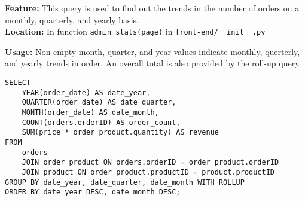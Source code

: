 \textbf{Feature:} This query is used to find out the trends in the number of orders on a monthly, quarterly, and yearly basis. \\
\textbf{Location:} In function \texttt{admin\_stats(page)} in \texttt{front-end/\_\_init\_\_.py}

\textbf{Usage:}
Non-empty month, quarter, and year values indicate monthly, querterly, and yearly trends in order.
An overall total is also provided by the roll-up query.

\begin{lstlisting}
SELECT
    YEAR(order_date) AS date_year,
    QUARTER(order_date) AS date_quarter,
    MONTH(order_date) AS date_month,
    COUNT(orders.orderID) AS order_count,
    SUM(price * order_product.quantity) AS revenue
FROM
    orders
    JOIN order_product ON orders.orderID = order_product.orderID
    JOIN product ON order_product.productID = product.productID
GROUP BY date_year, date_quarter, date_month WITH ROLLUP
ORDER BY date_year DESC, date_month DESC;
\end{lstlisting}